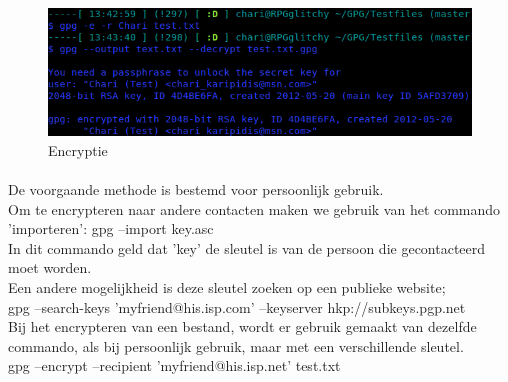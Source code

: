 \documentclass[12pt]{article}
\begin{document}
				\begin{figure}[!ht]
					\begin{center}
						\includegraphics[scale=0.4]{Pictures/Encryptie}
					\end{center}
					\caption{Encryptie}\label{Encryptie}
				\end{figure}
				
				\paragraph{}
				De voorgaande methode is bestemd voor persoonlijk gebruik.\\
				Om te encrypteren naar andere contacten maken we gebruik van het commando 
				'importeren': gpg --import key.asc\\
				In dit commando geld dat 'key' de sleutel is van de persoon die gecontacteerd
				moet worden.\\
				Een andere mogelijkheid is deze sleutel zoeken op een publieke website;\\
				gpg --search-keys 'myfriend@his.isp.com' --keyserver hkp://subkeys.pgp.net\\
				Bij het encrypteren van een bestand, wordt er gebruik gemaakt van dezelfde commando,
				als bij persoonlijk gebruik, maar met een verschillende sleutel.\\
				gpg --encrypt --recipient 'myfriend@his.isp.net' test.txt\\		
				\cite{GPGstart}
			
\end{document}
